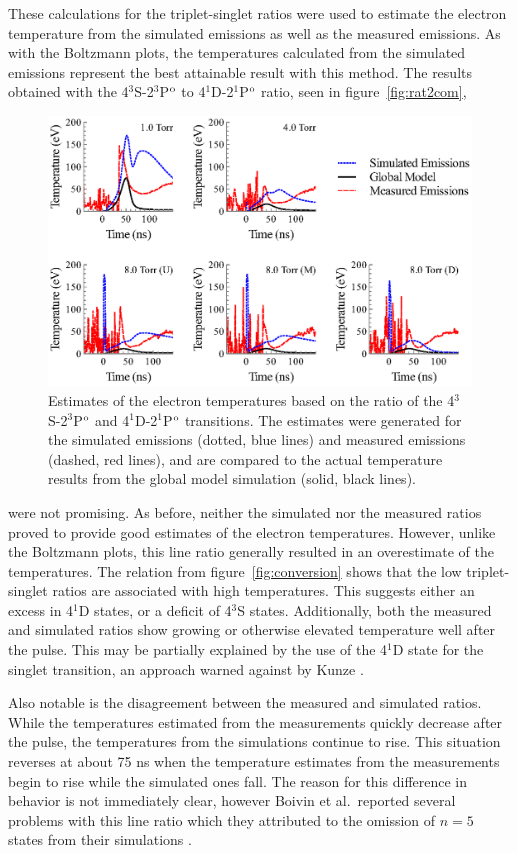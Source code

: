These calculations for the triplet-singlet ratios were used to estimate the
electron temperature from the simulated emissions as well as the measured
emissions. As with the Boltzmann plots, the temperatures calculated from the
simulated emissions represent the best attainable result with this method. The
results obtained with the 4$^3$S-2$^3$P$^\mathrm{o}$ to 4$^1$D-2$^1$P$^\mathrm{o}$ ratio, seen
in figure~\ref{fig:rat2com},
\begin{figure}
  \centering
  \includegraphics{./chapters/emissions/figures/rat2comp.eps}
  \caption{Estimates of the electron temperatures based on the ratio of the
    4$^3$S-2$^3$P$^\mathrm{o}$ and 4$^1$D-2$^1$P$^\mathrm{o}$ transitions. The estimates were
    generated for the simulated emissions (dotted, blue lines) and measured
    emissions (dashed, red lines), and are compared to the actual temperature
    results from the global model simulation (solid, black lines).}
  \label{fig:rat2comp}
\end{figure}
were not promising. As before, neither the simulated nor the measured ratios
proved to provide good estimates of the electron temperatures. However, unlike
the Boltzmann plots, this line ratio generally resulted in an overestimate of
the temperatures. The relation from figure~\ref{fig:conversion} shows that the
low triplet-singlet ratios are associated with high temperatures. This suggests
either an excess in 4$^1$D states, or a deficit of 4$^3$S states. Additionally,
both the measured and simulated ratios show growing or otherwise elevated
temperature well after the pulse. This may be partially explained by the use of
the 4$^1$D state for the singlet transition, an approach warned against by Kunze
\cite{Kunze2009}.

Also notable is the disagreement between the measured and simulated ratios.
While the temperatures estimated from the measurements quickly decrease after
the pulse, the temperatures from the simulations continue to rise. This
situation reverses at about 75 ns when the temperature estimates from the
measurements begin to rise while the simulated ones fall. The reason for this
difference in behavior is not immediately clear, however Boivin et al.\ reported
several problems with this line ratio which they attributed to the omission of
$n=5$ states from their simulations \cite{Boivin2007}. 

